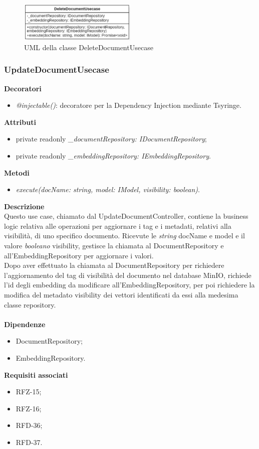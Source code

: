 \begin{figure}[h!]
    \centering  
    \includegraphics[width=0.5\textwidth]{DeleteDocumentUsecase.png}
    \caption{UML della classe DeleteDocumentUsecase}
\end{figure}

\subsubsection{UpdateDocumentUsecase}
\textbf{Decoratori}
\begin{itemize}
    \item \textit{@injectable()}: decoratore per la Dependency Injection mediante Tsyringe.
\end{itemize}
\textbf{Attributi}
\begin{itemize}[itemsep=-4pt]
    \item private readonly \textit{\_documentRepository: IDocumentRepository};
    \item private readonly \textit{\_embeddingRepository: IEmbeddingRepository}.
\end{itemize}
\textbf{Metodi}
\begin{itemize}
    \item \textit{execute(docName: string, model: IModel, visibility: boolean)}.
\end{itemize}
\textbf{Descrizione}\\
Questo use case, chiamato dal UpdateDocumentController, contiene la business logic relativa alle operazioni per aggiornare i tag e i metadati, relativi alla visibilità, di uno specifico documento. Ricevute le \textit{string} docName e model e il valore \textit{booleano} visibility, gestisce la chiamata al DocumentRepository e all'EmbeddingRepository per aggiornare i valori.\\
Dopo aver effettuato la chiamata al DocumentRepository per richiedere l'aggiornamento del tag di visibilità del documento nel database MinIO, richiede l'id degli embedding da modificare all'EmbeddingRepository, per poi richiedere la modifica del metadato visibility dei vettori identificati da essi alla medesima classe repository. \\ \\
\textbf{Dipendenze}
\begin{itemize}[itemsep=-4pt]
    \item DocumentRepository;
    \item EmbeddingRepository.
\end{itemize}
\textbf{Requisiti associati}
\begin{itemize}[itemsep=-4pt]
    \item RFZ-15;
    \item RFZ-16;
    \item RFD-36;
    \item RFD-37.
\end{itemize}

